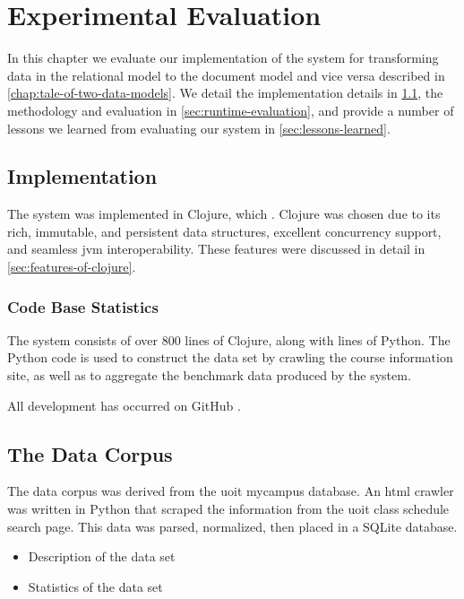\chapter{Experimental Evaluation}
\label{chap:experimental-evaluation}
	In this chapter we evaluate our implementation of the system for transforming data in the relational model to the document model and vice versa described in \cref{chap:tale-of-two-data-models}.  We detail the implementation details in \cref{sec:implementation}, the methodology and evaluation in \cref{sec:runtime-evaluation}, and provide a number of lessons we learned from evaluating our system in \cref{sec:lessons-learned}.
	
	\section{Implementation}
	\label{sec:implementation}
		The system was implemented in Clojure, which .  Clojure was chosen due to its rich, immutable, and persistent data structures, excellent concurrency support, and seamless \gls{jvm} interoperability.  These features were discussed in detail in \cref{sec:features-of-clojure}.
		
		\subsection{Code Base Statistics}
			The system consists of over 800 lines of Clojure, along with  lines of Python.  The Python code is used to construct the data set by crawling the course information site, as well as to aggregate the benchmark data produced by the system.
			
			All development has occurred on GitHub \cite{molly-repo}.
	
	\section{The Data Corpus}
	\label{sec:data-corpus}
		The data corpus was derived from the \gls{uoit} mycampus database.  An \gls{html} crawler was written in Python that scraped the information from the \gls{uoit} class schedule search page.  This data was parsed, normalized, then placed in a SQLite database.
		\begin{itemize}
			\item Description of the data set
			\item Statistics of the data set
		\end{itemize}
	
